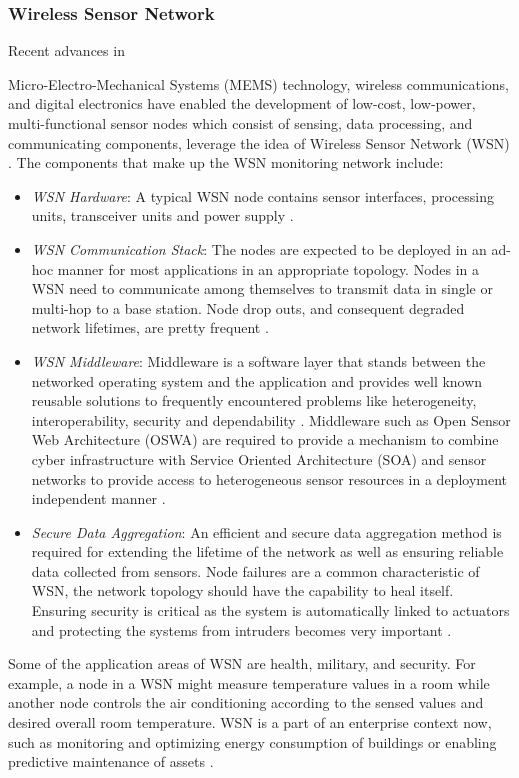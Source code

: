 \subsubsection{Wireless Sensor Network}
Recent advances in {Micro-Electro-Mechanical Systems (\acs{MEMS}) technology, wireless communications, and digital electronics have enabled the development of low-cost, low-power, multi-functional sensor nodes which consist of sensing, data processing, and communicating components, leverage the idea of Wireless Sensor Network (\acs{WSN}) \cite{WSNSURVEY,BPMN4WSN}. The components that make up the WSN monitoring network include:
\begin{itemize}
	\item \textit{\acs{WSN} Hardware}: A typical \acs{WSN} node contains sensor interfaces, processing units, transceiver units and power supply \cite{IOTGUBBI}.
	\item \textit{\acs{WSN} Communication Stack}: The nodes are expected to be deployed
	in an ad-hoc manner for most applications in an appropriate topology. Nodes in a \acs{WSN} need to communicate among themselves to transmit data in single or multi-hop to a base station. Node drop outs, and consequent degraded network lifetimes, are pretty frequent \cite{IOTGUBBI,WSNSURVEY}.
	\item \textit{\acs{WSN} Middleware}: Middleware is a software layer that stands between the networked operating system and the application and provides well known reusable solutions to frequently encountered problems like heterogeneity, interoperability, security and dependability \cite{MIDDLEWARE}. Middleware such as Open Sensor Web Architecture (\acs{OSWA}) are required to provide a mechanism to combine cyber infrastructure with Service Oriented Architecture (\acs{SOA}) and sensor networks to provide access to heterogeneous sensor resources in a deployment independent manner \cite{IOTGUBBI}.
	\item \textit{Secure Data Aggregation}: An efficient and secure data aggregation method is required for extending the lifetime of the network as well as ensuring reliable data collected from sensors. Node failures are a common characteristic of \acs{WSN}, the network topology should have the capability to heal itself. Ensuring security is critical as the system is automatically linked to actuators and protecting the systems from intruders becomes very important \cite{IOTGUBBI}.
\end{itemize}
Some of the application areas of \acs{WSN} are health, military, and security. For example, a node in a \acs{WSN} might measure temperature values in a room while another node controls the air conditioning according to the sensed values and desired overall room temperature. \acs{WSN} is a part of an enterprise context now, such as monitoring and optimizing energy consumption of buildings or enabling predictive maintenance of assets \cite{BPMN4WSN,WSNSURVEY}.
}
